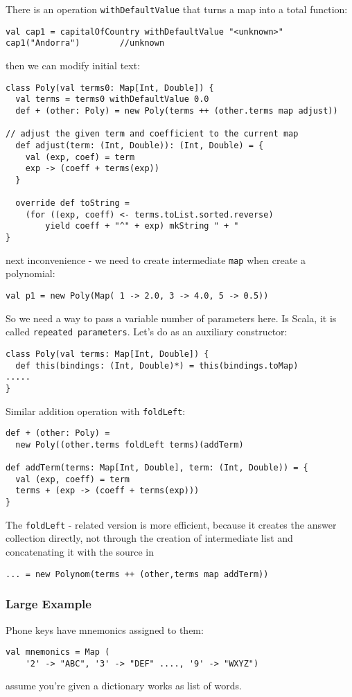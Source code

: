 \documentclass{scrartcl}
\newcommand{\term}[1]{\verb~#1~} %
\begin{document}
There is an operation \lstinline|withDefaultValue| that turns a map into a total
function:
\begin{lstlisting}
val cap1 = capitalOfCountry withDefaultValue "<unknown>"
cap1("Andorra")        //unknown
\end{lstlisting}
 then we can modify initial text:
\begin{lstlisting}
class Poly(val terms0: Map[Int, Double]) {
  val terms = terms0 withDefaultValue 0.0
  def + (other: Poly) = new Poly(terms ++ (other.terms map adjust))

// adjust the given term and coefficient to the current map
  def adjust(term: (Int, Double)): (Int, Double) = {
    val (exp, coef) = term
    exp -> (coeff + terms(exp))
  }

  override def toString =
    (for ((exp, coeff) <- terms.toList.sorted.reverse)
        yield coeff + "^" + exp) mkString " + "
}
\end{lstlisting}
next inconvenience - we need to create intermediate \lstinline|map| when create
a polynomial:
\begin{lstlisting}
val p1 = new Poly(Map( 1 -> 2.0, 3 -> 4.0, 5 -> 0.5))
\end{lstlisting}
So we need a way to pass a variable number of parameters here. Is Scala, it is
called \term{repeated parameters}. Let's do as an auxiliary constructor:
\begin{lstlisting}
class Poly(val terms: Map[Int, Double]) {
  def this(bindings: (Int, Double)*) = this(bindings.toMap)
.....
}
\end{lstlisting}

Similar addition operation with \lstinline|foldLeft|:
\begin{lstlisting}
def + (other: Poly) =
  new Poly((other.terms foldLeft terms)(addTerm)

def addTerm(terms: Map[Int, Double], term: (Int, Double)) = {
  val (exp, coeff) = term
  terms + (exp -> (coeff + terms(exp)))
}
\end{lstlisting}

The \lstinline|foldLeft| - related version is more efficient, because it creates
the answer collection directly, not through the creation of intermediate list
and concatenating it with the source in
\begin{lstlisting}
... = new Polynom(terms ++ (other,terms map addTerm))
\end{lstlisting}

\subsubsection{Large Example}
\label{sec:ExampleFindingFixedPoint}
Phone keys have mnemonics assigned to them:
\begin{lstlisting}
val mnemonics = Map (
    '2' -> "ABC", '3' -> "DEF" ...., '9' -> "WXYZ")
\end{lstlisting}
assume you're given a dictionary works as list of words.
\end{document}
